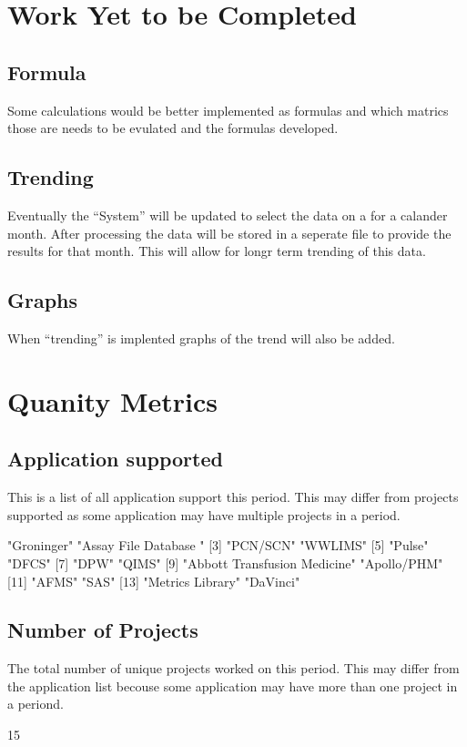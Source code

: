 \documentclass{article}
\begin{document}
\section{Work Yet to be Completed}
\subsection{Formula}
Some calculations would be better implemented as formulas and which matrics those
are needs to be evulated and the formulas developed.
\subsection{Trending}
Eventually the ``System'' will be updated to select the data on a for a calander
month. After processing the data will be stored in a seperate file to provide the
results for that month. This will allow for longr term trending of this data.
\subsection{Graphs}
When ``trending'' is implented graphs of the trend will also be added.

\section{Quanity Metrics}
\subsection{Application supported}
This is a list of all application support this period. This may differ from projects
supported as some application may have multiple projects in a period.
\begin{Schunk}
\begin{Soutput}
 [1] "Groninger"                   "Assay File Database "       
 [3] "PCN/SCN"                     "WWLIMS"                     
 [5] "Pulse"                       "DFCS"                       
 [7] "DPW"                         "QIMS"                       
 [9] "Abbott Transfusion Medicine" "Apollo/PHM"                 
[11] "AFMS"                        "SAS"                        
[13] "Metrics Library"             "DaVinci"                    
\end{Soutput}
\end{Schunk}
\subsection{Number of Projects}
The total number of unique projects worked on this period. This may differ from the
application list becouse some application may have more than one project in a periond.
\begin{Schunk}
\begin{Soutput}
[1] 15
\end{Soutput}
\end{Schunk}
\end{document}
